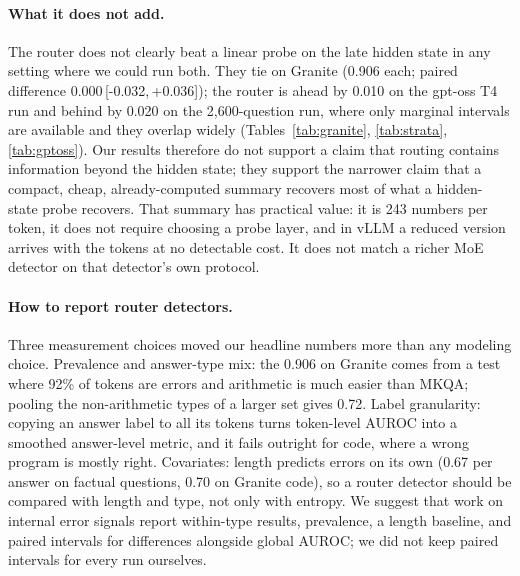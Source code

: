 \documentclass[11pt]{article}
\newcommand{\ci}[2]{\,[#1,\,#2]}
\begin{document}
\paragraph{What it does not add.}
The router does not clearly beat a linear probe on the late hidden state in any setting where we could run both.
They tie on Granite (0.906 each; paired difference $0.000$\ci{-0.032}{+0.036}); the router is ahead by 0.010 on the gpt-oss T4 run and behind by 0.020 on the 2,600-question run, where only marginal intervals are available and they overlap widely (Tables~\ref{tab:granite}, \ref{tab:strata}, \ref{tab:gptoss}).
Our results therefore do not support a claim that routing contains information beyond the hidden state; they support the narrower claim that a compact, cheap, already-computed summary recovers most of what a hidden-state probe recovers.
That summary has practical value: it is 243 numbers per token, it does not require choosing a probe layer, and in vLLM a reduced version arrives with the tokens at no detectable cost.
It does not match a richer MoE detector on that detector's own protocol.

\paragraph{How to report router detectors.}
Three measurement choices moved our headline numbers more than any modeling choice.
Prevalence and answer-type mix: the 0.906 on Granite comes from a test where 92\% of tokens are errors and arithmetic is much easier than MKQA; pooling the non-arithmetic types of a larger set gives 0.72.
Label granularity: copying an answer label to all its tokens turns token-level AUROC into a smoothed answer-level metric, and it fails outright for code, where a wrong program is mostly right.
Covariates: length predicts errors on its own (0.67 per answer on factual questions, 0.70 on Granite code), so a router detector should be compared with length and type, not only with entropy.
We suggest that work on internal error signals report within-type results, prevalence, a length baseline, and paired intervals for differences alongside global AUROC; we did not keep paired intervals for every run ourselves.
\end{document}
